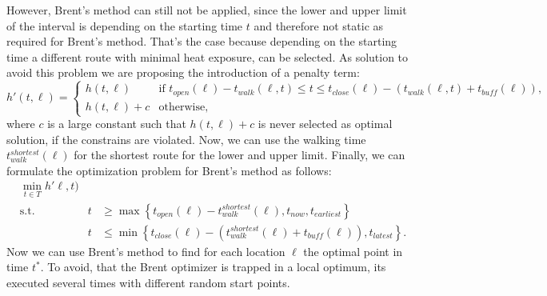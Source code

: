  However, Brent's method can still not be applied, since the lower and upper limit of the interval is depending on the starting time $t$ and therefore not static as required for Brent's method. That's the case because depending on the starting time a different route with minimal heat exposure, can be selected. As solution to avoid this problem we are proposing the introduction of a penalty term:
 \begin{equation}
 \label{eq:optimal-time-penality}
 h'(t,\ell) = \begin{cases}
 h(t,\ell) & \text{if }t_{open}(\ell)-t_{walk}(\ell,t) \leq t \leq  t_{close}(\ell)-(t_{walk}(\ell,t)+t_{buff}(\ell)),\\
 h(t,\ell)  + c & \text{otherwise,}
 \end{cases}
 \end{equation}
 where $c$ is a large constant such that $h(t,\ell) + c$ is never selected as optimal solution, if the constrains are violated. Now, we can use the walking time $t_{walk}^{shortest}(\ell)$  for the shortest route for the lower and upper limit. Finally, we can formulate the optimization problem for Brent's method as follows:
 \begin{subequations}
 	\label{eq:brent-optimization-problem}
 	\begin{alignat}{2}
 	&\min_{t \in T} h'\ell, t) && \\
 	&\text{s.t.} & t & \geq \max\left\lbrace  t_{open}(\ell)-t_{walk}^{shortest}(\ell), t_{now}, t_{earliest} \right\rbrace \\
 	& & t &\leq \min\left\lbrace  t_{close}(\ell)- \left(t_{walk}^{shortest}(\ell) + t_{buff}(\ell)\right), t_{latest} \right\rbrace.
 	\end{alignat}
 \end{subequations}
Now we can use Brent's method to find for each location $\ell$ the optimal point in time $t^*$. To avoid, that the Brent optimizer is trapped in a local optimum, its executed several times with different random start points.
